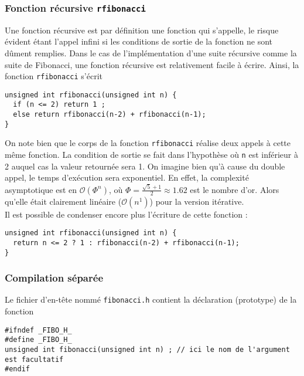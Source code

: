 \documentclass{book}
\begin{document}
\begin{correction}
\subsubsection{Fonction récursive \texttt{rfibonacci}}

Une fonction récursive est par définition une fonction qui s'appelle, le risque
évident étant l'appel infini si les conditions de sortie de la fonction ne sont
dûment remplies. Dans le cas de l'implémentation d'une suite récursive comme la
suite de Fibonacci, une fonction récursive est relativement facile à écrire.
Ainsi, la fonction \texttt{rfibonacci} s'écrit

\begin{verbatim}
unsigned int rfibonacci(unsigned int n) {
  if (n <= 2) return 1 ;
  else return rfibonacci(n-2) + rfibonacci(n-1);
}
\end{verbatim}

On note bien que le corps de la fonction \texttt{rfibonacci} réalise deux appels à cette
même fonction. La condition de sortie se fait dans l'hypothèse où \texttt{n} est
inférieur à 2 auquel cas la valeur retournée sera 1. On imagine bien qu'à cause du double appel, le temps d'exécution sera exponentiel. En effet, la complexité asymptotique est en $\mathcal{O}(\Phi^n)$, où $\Phi=\frac{\sqrt{5}+1}{2}\approx 1.62$ est le nombre d'or. Alors qu'elle était clairement linéaire ($\mathcal{O}(n^1)$) pour la version itérative.\\

Il est possible de condenser encore plus l'écriture de cette fonction :

\begin{verbatim}
unsigned int rfibonacci(unsigned int n) {
  return n <= 2 ? 1 : rfibonacci(n-2) + rfibonacci(n-1);
}
\end{verbatim}

\subsubsection{Compilation séparée}


Le fichier d'en-tête nommé \texttt{fibonacci.h} contient la déclaration (prototype) de la fonction

\begin{verbatim}
#ifndef _FIBO_H_
#define _FIBO_H_
unsigned int fibonacci(unsigned int n) ; // ici le nom de l'argument est facultatif
#endif
\end{verbatim}


\end{correction}
\end{document}
